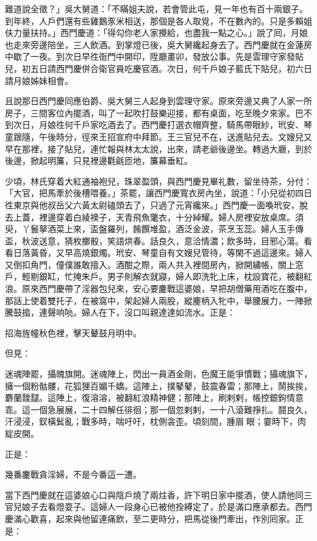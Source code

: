難道說全徵？」吳大舅道：「不瞞姐夫說，若會管此屯，見一年也有百十兩銀子。到年終，人戶們還有些雞鵝豕米相送，那個是各人取覓，不在數內的。只是多賴姐伕力量扶持。」西門慶道：「得勾你老人家攪給，也盡我一點之心。」說了囘，月娘也走來旁邊陪坐，三人飲酒。到掌燈已後，吳大舅纔起身去了。西門慶就在金蓮房中歇了一夜。到次日早徃衙門中開印，陞廳畫卯，發放公事。先是雲理守家發貼兒，初五日請西門慶併合衛官員吃慶官酒。次日，何千戶娘子藍氏下貼兒，初六日請月娘姊妹相會。

且說那日西門慶同應伯爵、吳大舅三人起身到雲理守家。原來旁邊又典了人家一所房子，三間客位內擺酒，叫了一起吹打鼓樂迎接，都有桌面，吃至晚夕來家。巴不到次日，月娘徃何千戶家吃酒去了。西門慶打選衣帽齊整，騎馬帶眼紗，玳安、琴童跟隨，午後時分，徑來王招宣府中拜節。王三官兒不在，送進貼兒去。文嫂兒又早在那裡，接了貼兒，連忙報與林太太說，出來，請老爺後邊坐。轉過大廳，到於後邊，掀起明簾，只見裡邊氍毹匝地，簾幕垂紅。

少頃，林氏穿着大紅通袖袍兒，珠翠盈頭，與西門慶見畢礼數，留坐待茶，分付：「大官，把馬牽於後槽喂養。」茶罷，讓西門慶寬衣房內坐，說道：「小兒從初四日徃東京與他叔岳父六黃太尉磕頭去了，只過了元宵纔來。」西門慶一面喚玳安，脫去上蓋，裡邊穿着白綾襖子，天青飛魚氅衣，十分綽耀。婦人房裡安放桌席。須臾，丫鬟拏酒菜上來，盃盤羅列，餚饌堆盈，酒泛金波，茶烹玉蕊。婦人玉手傳盃，秋波送意，猜枚擲骰，笑語烘春。話良久，意洽情濃；飲多時，目邪心蕩。看看日落黃昏，又早高燒銀燭。玳安、琴童自有文嫂兒管待，等閑不過這邊來。婦人又倒扣角門，僮僕誰敢擅入。酒酣之際，兩人共入裡間房內，掀開繡帳，關上窓戶，輕剔銀缸，忙掩朱戶。男子則解衣就寢，婦人即洗牝上床，枕設寶花，被翻紅浪。原來西門慶帶了淫器包兒來，安心要鏖戰這婆娘，早把胡僧藥用酒吃在腹中，那話上使着雙托子，在被窩中，架起婦人兩股，縱麈柄入牝中，舉腰展力，一陣掀騰鼓搗，連聲响喨。婦人在下，沒口叫親達達如流水。正是：

招海旌幢秋色裡，擊天鼙鼓月明中。

但見：

迷魂陣罷，攝魄旗開。迷魂陣上，閃出一員酒金剛，色魔王能爭慣戰；攝魂旗下，擁一個粉骷髏，花狐狸百媚千嬌。這陣上，撲鼕鼕，鼓震春雷；那陣上，鬧挨挨，麝蘭靉靆。這陣上，復溶溶，被翻紅浪精神健；那陣上，刷剌剌，帳控銀鉤情意乖。這一個急展展，二十四解任徘徊；那一個忽剌剌，一十八滾難掙扎。鬪良久，汗浸浸，釵橫鬂亂；戰多時，喘吁吁，枕側衾歪。頃刻間，腫眉𦣘眼；霎時下，肉綻皮開。

正是：

幾番鏖戰貪淫婦，不是今番這一遭。

當下西門慶就在這婆娘心口與陰戶燒了兩炷香，許下明日家中擺酒，使人請他同三官兒娘子去看燈耍子。這婦人一段身心已被他拴縛定了，於是滿口應承都去。西門慶滿心歡喜，起來與他留連痛飲，至二更時分，把馬從後門牽出，作別囘家。正是：

